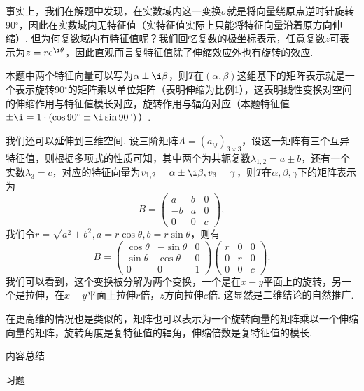 事实上，我们在解题中发现，在实数域内这一变换$\sigma$就是将向量绕原点逆时针旋转90$^\circ$，因此在实数域内无特征值（实特征值实际上只能将特征向量沿着原方向伸缩）. 但为何复数域内有特征值呢？我们回忆复数的极坐标表示，任意复数$z$可表示为$z=re^{\i\theta}$，因此直观而言复特征值除了伸缩效应外也有旋转的效应.

本题中两个特征向量可以写为$\alpha\pm \i\beta$，则$T$在$(\alpha,\beta)$这组基下的矩阵表示就是一个表示旋转90$^\circ$的矩阵乘以单位矩阵（表明伸缩为比例1），这表明线性变换对空间的伸缩作用与特征值模长对应，旋转作用与辐角对应（本题特征值$\pm \i=1\cdot(\cos 90^\circ\pm \i\sin 90^\circ)$）.

我们还可以延伸到三维空间. 设三阶矩阵$A=(a_{ij})_{3\times 3}$，设这一矩阵有三个互异特征值，则根据多项式的性质可知，其中两个为共轭复数$\lambda_{1,2}=a\pm b$，还有一个实数$\lambda_3=c$，对应的特征向量为$v_{1,2}=\alpha\pm \i\beta,v_3=\gamma$，则$T$在$\alpha,\beta,\gamma$下的矩阵表示为
\[ B=\begin{pmatrix}
        a & b & 0 \\ -b & a & 0 \\ 0 & 0 & c
    \end{pmatrix}, \]
我们令$r=\sqrt{a^2+b^2},a=r\cos\theta,b=r\sin\theta$，则有
\[ B=\begin{pmatrix}
        \cos\theta & -\sin\theta & 0 \\ \sin\theta & \cos\theta & 0 \\ 0 & 0 & 1
    \end{pmatrix}\begin{pmatrix}
        r & 0 & 0 \\ 0 & r & 0 \\ 0 & 0 & c
    \end{pmatrix}. \]
我们可以看到，这个变换被分解为两个变换，一个是在$x-y$平面上的旋转，另一个是拉伸，在$x-y$平面上拉伸$r$倍，$z$方向拉伸$c$倍. 这显然是二维结论的自然推广.

在更高维的情况也是类似的，矩阵也可以表示为一个旋转向量的矩阵乘以一个伸缩向量的矩阵，旋转角度是复特征值的辐角，伸缩倍数是复特征值的模长.

\vspace{2ex}
\centerline{\heiti \Large 内容总结}

\vspace{2ex}
\centerline{\heiti \Large 习题}

\vspace{2ex}
{\kaishu }
\begin{flushright}
    \kaishu

\end{flushright}

